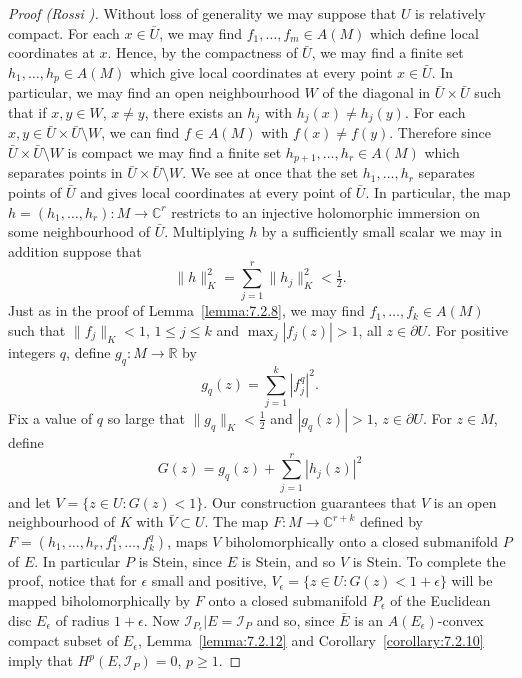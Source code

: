 \begin{proof}[Proof (Rossi \cite{bib:II:rossi-h:1})]
Without loss of generality we may suppose that $U$ is relatively compact. For each $x\in\bar U$, we may find $f_1,\ldots,f_m\in A(M)$ which define local coordinates at $x$. Hence, by the compactness of $\bar U$, we may find a finite set $h_1,\ldots,h_p\in A(M)$ which give local coordinates at every point $x\in\bar U$. In particular, we may find an open neighbourhood $W$ of the diagonal in $\bar U\times\bar U$ such that if $x,y\in W$, $x\ne y$, there exists an $h_j$ with $h_j(x)\ne h_j(y)$. For each $x,y\in\bar U\times\bar U\setminus W$, we can find $f\in A(M)$ with $f(x)\ne f(y)$. Therefore since $\bar U\times\bar U\setminus W$ is compact we may find a finite set $h_{p+1},\ldots,h_r\in A(M)$ which separates points in $\bar U\times\bar U\setminus W$. We see at once that the set $h_1,\ldots,h_r$ separates points of $\bar U$ and gives local coordinates at every point of $\bar U$. In particular, the map $h=(h_1,\ldots,h_r):M\to\mathbb C^r$ restricts to an injective holomorphic immersion on some neighbourhood of $\bar U$. Multiplying $h$ by a sufficiently small scalar we may in addition suppose that
\[
\|h\|_K^2=\sum_{j=1}^r\|h_j\|_K^2<\tfrac12.
\]
Just as in the proof of Lemma~\ref{lemma:7.2.8}, we may find $f_1,\ldots,f_k\in A(M)$ such that $\|f_j\|_K<1$, $1\leq j\leq k$ and $\max_j|f_j(z)|>1$, all $z\in\partial U$. For positive integers $q$, define $g_q:M\to\mathbb R$ by
\[
g_q(z)=\sum_{j=1}^k|f_j^q|^2.
\]
Fix a value of $q$ so large that $\|g_q\|_K<\tfrac12$ and $|g_q(z)|>1$, $z\in\partial U$. For $z\in M$, define
\[
G(z)=g_q(z)+\sum_{j=1}^r|h_j(z)|^2
\]
and let $V=\{z\in U:G(z)<1\}$. Our construction guarantees that $V$ is an open neighbourhood of $K$ with $\bar V\subset U$. The map $F:M\to\mathbb C^{r+k}$ defined by $F=(h_1,\ldots,h_r,f_1^q,\ldots,f_k^q)$, maps $V$ biholomorphically onto a closed submanifold $P$ of $E$. In particular $P$ is Stein, since $E$ is Stein, and so $V$ is Stein.
To complete the proof, notice that for $\epsilon$ small and positive, $V_\epsilon=\{z\in U:G(z)<1+\epsilon\}$ will be mapped biholomorphically by $F$ onto a closed submanifold $P_\epsilon$ of the Euclidean disc $E_\epsilon$ of radius $1+\epsilon$. Now $\mathcal I_{P_\epsilon}|E=\mathcal I_P$ and so, since $\bar E$ is an $A(E_\epsilon)$-convex compact subset of $E_\epsilon$, Lemma~\ref{lemma:7.2.12} and Corollary~\ref{corollary:7.2.10} imply that $H^p(E,\mathcal I_P)=0$, $p\geq1$.
\end{proof}
